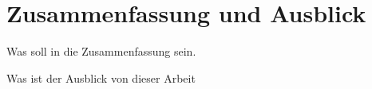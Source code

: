 \chapter{Zusammenfassung und Ausblick}
\label{zusammenfassung_und_ausblick}

Was soll in die Zusammenfassung sein.

Was ist der Ausblick von dieser Arbeit
